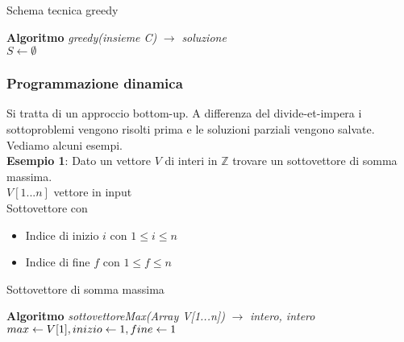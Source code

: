 \begin{algorithm}
    \caption{Schema tecnica greedy}
    \Indm\textbf{Algoritmo} \emph{greedy(insieme C)} $\rightarrow$ \emph{soluzione} \\
    \Indp$S \leftarrow \emptyset$\\
\end{algorithm}
\clearpage

\subsubsection{Programmazione dinamica}
Si tratta di un approccio bottom-up. A differenza del divide-et-impera i sottoproblemi vengono 
risolti prima e le soluzioni parziali vengono salvate.
Vediamo alcuni esempi.\\
\textbf{Esempio 1}: Dato un vettore $V$ di interi in $\mathbb{Z}$ trovare un sottovettore di somma massima.\\
$V[1...n]$ vettore in input\\
Sottovettore con
\begin{itemize}
    \item Indice di inizio $i$ con $1 \le i \le n$
    \item Indice di fine $f$ con $1 \le f \le n$
\end{itemize}
\begin{algorithm}
    \caption{Sottovettore di somma massima}
    \Indm\textbf{Algoritmo} \emph{sottovettoreMax(Array V[1...n])} $\rightarrow$ \emph{intero, intero}\\
    \Indp$max \leftarrow V[1], \space inizio \leftarrow 1, \space fine \leftarrow 1$\\
\end{algorithm}

